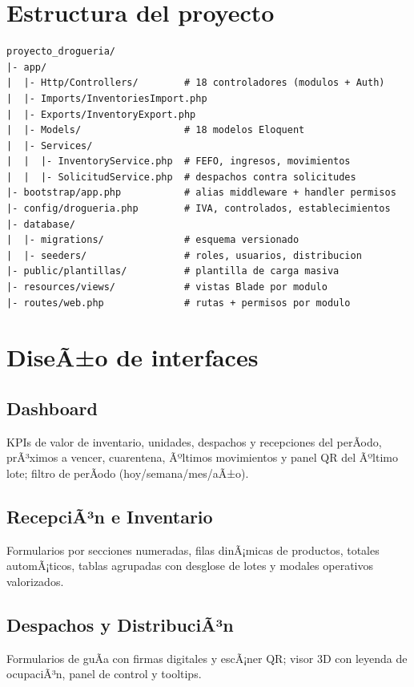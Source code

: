 ﻿\documentclass[a4paper, 12pt]{article}
\begin{document}
\section{Estructura del proyecto}
\begin{lstlisting}
proyecto_drogueria/
|- app/
|  |- Http/Controllers/        # 18 controladores (modulos + Auth)
|  |- Imports/InventoriesImport.php
|  |- Exports/InventoryExport.php
|  |- Models/                  # 18 modelos Eloquent
|  |- Services/
|  |  |- InventoryService.php  # FEFO, ingresos, movimientos
|  |  |- SolicitudService.php  # despachos contra solicitudes
|- bootstrap/app.php           # alias middleware + handler permisos
|- config/drogueria.php        # IVA, controlados, establecimientos
|- database/
|  |- migrations/              # esquema versionado
|  |- seeders/                 # roles, usuarios, distribucion
|- public/plantillas/          # plantilla de carga masiva
|- resources/views/            # vistas Blade por modulo
|- routes/web.php              # rutas + permisos por modulo
\end{lstlisting}

\section{DiseÃ±o de interfaces}

\subsection{Dashboard}
KPIs de valor de inventario, unidades, despachos y recepciones del perÃ­odo, prÃ³ximos a vencer, cuarentena, Ãºltimos movimientos y panel QR del Ãºltimo lote; filtro de perÃ­odo (hoy/semana/mes/aÃ±o).

\subsection{RecepciÃ³n e Inventario}
Formularios por secciones numeradas, filas dinÃ¡micas de productos, totales automÃ¡ticos, tablas agrupadas con desglose de lotes y modales operativos valorizados.

\subsection{Despachos y DistribuciÃ³n}
Formularios de guÃ­a con firmas digitales y escÃ¡ner QR; visor 3D con leyenda de ocupaciÃ³n, panel de control y tooltips.
\end{document}

